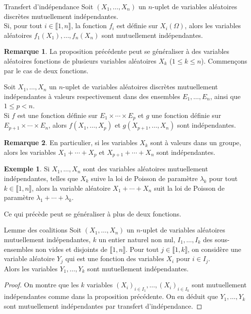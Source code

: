 \documentclass[french]{article}
\theoremstyle{plain}
\theoremstyle{definition}
\newtheorem*{ex}{Exemple}
\newtheorem*{rmq}{Remarque}
\theoremstyle{remark}
\begin{document}
\begin{thm}{Transfert d'indépendance}%
	Soit $(X_1,\ldots,X_n)$ un $n$-uplet de variables aléatoires discrètes mutuellement indépendantes.\\
	Si, pour tout $i\in\llbracket1,n\rrbracket$, la fonction $f_i$ est définie sur $X_i(\Omega)$, alors les variables aléatoires $f_1(X_1),\ldots,f_n(X_n)$ sont mutuellement indépendantes.
\end{thm}

\begin{rmq}
	La proposition précédente peut se généraliser à des variables aléatoires fonctions de plusieurs variables aléatoires $X_k$ ($1\leqslant k\leqslant n$). Commençons par le cas de deux fonctions.
\end{rmq}

\begin{thm}{}%
	Soit $X_1,\ldots,X_n$ un $n$-uplet de variables aléatoires discrètes mutuellement indépendantes à valeurs respectivement dans des ensembles $E_1,\ldots,E_n$, ainsi que $1\leqslant p<n$.\\
	Si $f$ est une fonction définie sur $E_1\times\cdots\times E_p$ et $g$ une fonction définie sur $E_{p+1}\times\cdots\times E_n$, alors $f(X_1,\ldots,X_p)$ et $g(X_{p+1},\ldots,X_n)$ sont indépendantes.
\end{thm}

\begin{rmq}
	En particulier, si les variables $X_k$ sont à valeurs dans un groupe, alors les variables $X_1+\cdots+X_p$ et $X_{p+1}+\cdots+X_n$ sont indépendantes.
\end{rmq}

\begin{ex}
	Si $X_1,\ldots,X_n$ sont des variables aléatoires mutuellement indépendantes, telles que $X_k$ suive la loi de Poisson de paramètre $\lambda_k$ pour tout $k\in\llbracket1,n\rrbracket$, alors la variable aléatoire $X_1+\cdots+X_n$ suit la loi de Poisson de paramètre $\lambda_1+\cdots+\lambda_k$.
\end{ex}

Ce qui précède peut se généraliser à plus de deux fonctions.

\begin{thm}{Lemme des coalitions}%
	Soit $(X_1,\ldots,X_n)$ un $n$-uplet de variables aléatoires mutuellement indépendantes, $k$ un entier naturel non nul, $I_1,\ldots,I_k$ des sous-ensembles non vides et disjoints de $\llbracket1,n\rrbracket$. Pour tout $j\in\llbracket1,k\rrbracket$, on considère une variable aléatoire $Y_j$ qui est une fonction des variables $X_i$ pour $i\in I_j$. \\
	Alors les variables $Y_1,\ldots,Y_k$ sont mutuellement indépendantes.
\end{thm}
\begin{proof}
	On montre que les $k$ variables $(X_i)_{i\in I_1},\ldots,(X_i)_{i\in I_k}$ sont mutuellement indépendantes comme dans la proposition précédente. On en déduit que $Y_1,\ldots,Y_k$ sont mutuellement indépendantes par transfert d'indépendance.
\end{proof}
\end{document}
